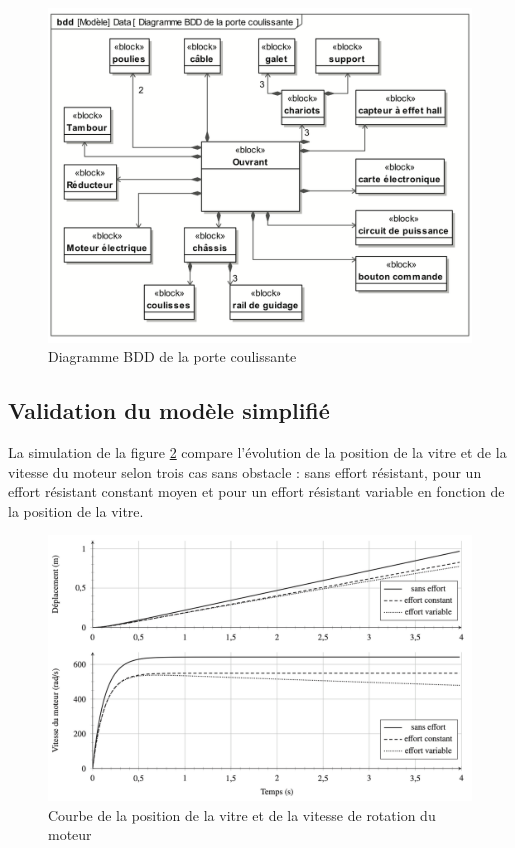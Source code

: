 

\begin{figure}[!h]
\centering\includegraphics[width=0.6\linewidth]{img/figure09}
 \caption{Diagramme BDD de la porte coulissante}
 \label{img09}
\end{figure}

\newpage

\subsection{Validation du modèle simplifié}

La simulation de la figure \ref{img11} compare l'évolution de la position de la vitre et de la vitesse du moteur selon trois cas sans obstacle : sans effort résistant, pour un effort résistant constant moyen et pour un effort résistant variable en fonction de la position de la vitre. 

\begin{figure}[!h]
\centering\includegraphics[width=0.75\linewidth]{img/figure11}
 \caption{Courbe de la position de la vitre et de la vitesse de rotation du moteur}
 \label{img11}
\end{figure}

